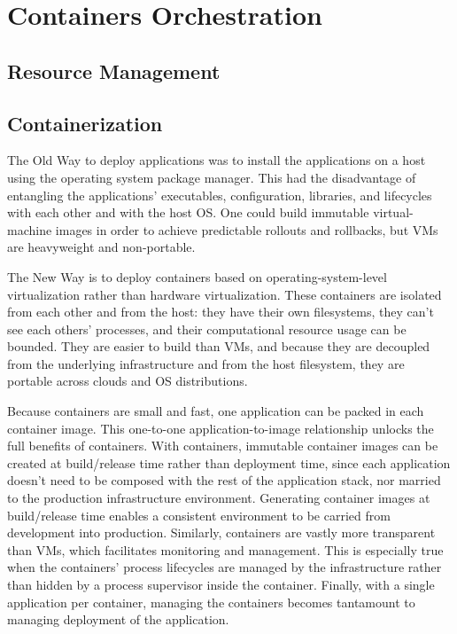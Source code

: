 \chapter{Containers Orchestration}
\label{chp:containers-orchestration}


\lipsum[1]


\section{Resource Management}
\label{sec:containers-orchestration-resource-management}

\lipsum[1]


\section{Containerization}
\label{sec:containers-orchestration-containerization}

The Old Way to deploy applications was to install the applications on a host using the operating system package manager. This had the disadvantage of entangling the applications’ executables, configuration, libraries, and lifecycles with each other and with the host OS. One could build immutable virtual-machine images in order to achieve predictable rollouts and rollbacks, but VMs are heavyweight and non-portable.

The New Way is to deploy containers based on operating-system-level virtualization rather than hardware virtualization. These containers are isolated from each other and from the host: they have their own filesystems, they can’t see each others’ processes, and their computational resource usage can be bounded. They are easier to build than VMs, and because they are decoupled from the underlying infrastructure and from the host filesystem, they are portable across clouds and OS distributions.

Because containers are small and fast, one application can be packed in each container image. This one-to-one application-to-image relationship unlocks the full benefits of containers. With containers, immutable container images can be created at build/release time rather than deployment time, since each application doesn’t need to be composed with the rest of the application stack, nor married to the production infrastructure environment. Generating container images at build/release time enables a consistent environment to be carried from development into production. Similarly, containers are vastly more transparent than VMs, which facilitates monitoring and management. This is especially true when the containers’ process lifecycles are managed by the infrastructure rather than hidden by a process supervisor inside the container. Finally, with a single application per container, managing the containers becomes tantamount to managing deployment of the application.

